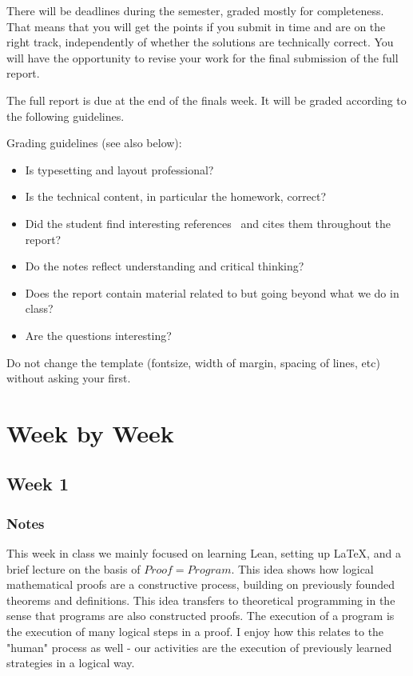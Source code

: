 \documentclass{article}
\theoremstyle{theorem}
\theoremstyle{definition}
\theoremstyle{remark}
\begin{document}
There will be deadlines during the semester, graded mostly for completeness. That means that you will get the points if you submit in time and are on the right track, independently of whether the solutions are technically correct. You will have the opportunity to revise your work for the final submission of the full report.

The full report is due at the end of the finals week. It will be graded according to the following guidelines.

Grading  guidelines (see also below):
\begin{itemize}
\item Is typesetting and layout professional? 
\item Is the technical content, in particular the homework, correct?
\item Did the student find interesting references~\cite{bla} and cites them throughout the report?
\item Do the notes reflect understanding and critical thinking?
\item Does the report contain material related to but going beyond what we do in class?
\item Are the questions interesting?
\end{itemize}

Do not change the template (fontsize, width of margin, spacing of lines, etc) without asking your first.

\section{Week by Week}\label{homework}

\subsection{Week 1}

\subsubsection*{Notes}
This week in class we mainly focused on learning Lean, setting up \LaTeX, and a brief lecture on the basis of $Proof = Program$. This idea shows how logical mathematical proofs are a constructive process, building on previously founded theorems and definitions. This idea transfers to theoretical programming in the sense that programs are also constructed proofs. The execution of a program is the execution of many logical steps in a proof. I enjoy how this relates to the "human" process as well - our activities are the execution of previously learned strategies in a logical way.
\end{document}

